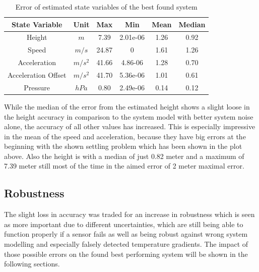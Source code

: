 \begin{table}[h!]
\centering
\begin{tabular}{cccccc}
\hline
\multicolumn{1}{|c|}{State Variable} & \multicolumn{1}{c|}{Unit} & \multicolumn{1}{c|}{Max} & \multicolumn{1}{c|}{Min} & \multicolumn{1}{c|}{Mean} & \multicolumn{1}{c|}{Median} \\ \hline
Height                            & $m$                         & 7.39	                  & 2.01e-06                 & 1.26                    & 0.92                      \\
Speed                             & $m/s$                       & 24.87                   & 0                        & 1.61                    & 1.26                      \\
Acceleration                       & $m/s^2$   			& 41.66                   & 4.86-06                  & 1.28                    & 0.70                     \\
Acceleration Offset                & $m/s^2$   			& 41.70                   & 5.36e-06                 & 1.01                    & 0.61                     \\
Pressure		          & $hPa$   			& 0.80                    & 2.49e-06                 & 0.14                    & 0.12
\end{tabular}
\caption{Error of estimated state variables of the best found system}
\label{tab:ErrorBestPerformanceSystem}
\end{table}

While the median of the error from the estimated height shows a slight loose in the height accuracy in comparison to the system model with better system noise alone,
the accuracy of all other values has increased.
This is especially impressive in the mean of the speed and acceleration, because they have big errors at the beginning with the shown settling problem which has been shown in the plot above.
Also the height is with a median of just 0.82 meter and a maximum of 7.39 meter still most of the time in the aimed error of 2 meter maximal error.

\subsection{Robustness}
The slight loss in accuracy was traded for an increase in robustness which is seen as more important due to different uncertainties,
which are still being able to function properly if a sensor fails as well as being robust against wrong system modelling
and especially falsely detected temperature gradients. The impact of those possible errors on the found best performing system will be shown in the following sections.

